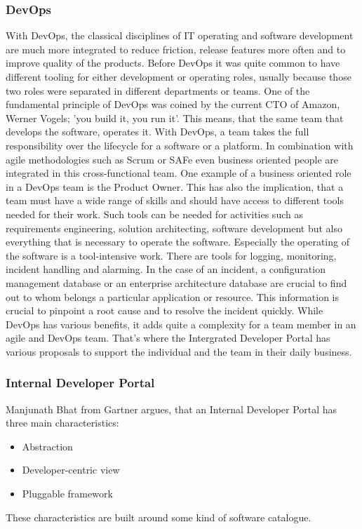 \documentclass[a4paper,12pt]{article}
\begin{document}
    \subsubsection{DevOps}
    With DevOps, the classical disciplines of IT operating and software development are much more integrated to reduce
    friction, release features more often and to improve quality of the products\parencite{safedevops}.
    Before DevOps it was quite common to have different tooling for either development or operating roles, usually
    because those two roles were separated in different departments or teams.
    One of the fundamental principle of DevOps was coined by the current CTO of Amazon, Werner Vogels;
    'you build it, you run it'\parencite{vogels}.
    This means, that the same team that develops the software, operates it.
    With DevOps, a team takes the full responsibility over the lifecycle for a software or a platform.
    In combination with agile methodologies such as Scrum or SAFe even business oriented people are integrated in this
    cross-functional team.
    One example of a business oriented role in a DevOps team is the Product Owner\parencite{safepo}.
    This has also the implication, that a team must have a wide range of skills and should have access to different
    tools needed for their work.
    Such tools can be needed for activities such as requirements engineering, solution architecting, software development
    but also everything that is necessary to operate the software.
    Especially the operating of the software is a tool-intensive work.
    There are tools for logging, monitoring, incident handling and alarming.
    In the case of an incident, a configuration management database or an enterprise architecture database are crucial
    to find out to whom belongs a particular application or resource.
    This information is crucial to pinpoint a root cause and to resolve the incident quickly.
    While DevOps has various benefits, it adds quite a complexity for a team member in an agile and DevOps team.
    That's where the Intergrated Developer Portal has various proposals to support the individual and the team in their
    daily business.

    \subsubsection{Internal Developer Portal}
    Manjunath Bhat from Gartner argues, that an Internal Developer Portal has three main characteristics\parencite{gartner}:
    \begin{itemize}
        \item Abstraction
        \item Developer-centric view
        \item Pluggable framework
    \end{itemize}
    These characteristics are built around some kind of software catalogue.
\end{document}
